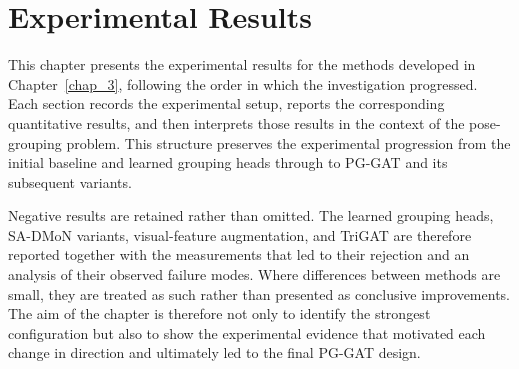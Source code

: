 
\chapter{Experimental Results}
\label{chap_4}

This chapter presents the experimental results for the methods developed
in Chapter~\ref{chap_3},
following the order in which the investigation progressed.
Each section records the experimental setup,
reports the corresponding quantitative results,
and then interprets those results in the context of the pose-grouping problem.
This structure preserves the experimental progression
from the initial baseline and learned grouping heads
through to PG-GAT and its subsequent variants.

Negative results are retained rather than omitted.
The learned grouping heads,
SA-DMoN variants,
visual-feature augmentation,
and TriGAT are therefore reported together with the measurements
that led to their rejection and an analysis of their observed failure modes.
Where differences between methods are small,
they are treated as such
rather than presented as conclusive improvements.
The aim of the chapter is therefore not only to identify the strongest
configuration
but also to show the experimental evidence that motivated each change
in direction and ultimately led to the final PG-GAT design.














